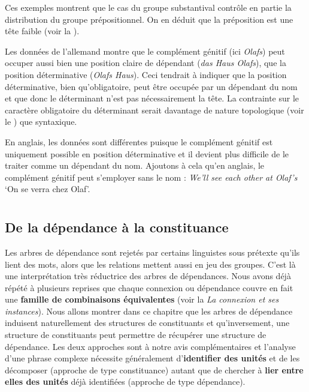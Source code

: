 {     Ces exemples montrent que le cas du groupe substantival contrôle en partie la distribution du groupe prépositionnel. On en déduit que la préposition est une tête faible (voir la ).

     Les données de l’allemand montre que le complément génitif (ici \textit{Olafs}) peut occuper aussi bien une position claire de dépendant (\textit{das Haus Olafs}), que la position déterminative (\textit{Olafs Haus}). Ceci tendrait à indiquer que la position déterminative, bien qu’obligatoire, peut être occupée par un dépendant du nom et que donc le déterminant n’est pas nécessairement la tête. La contrainte sur le caractère obligatoire du déterminant serait davantage de nature topologique (voir le ) que syntaxique.

    En anglais, les données sont différentes puisque le complément génitif est uniquement possible en position déterminative et il devient plus difficile de le traiter comme un dépendant du nom. Ajoutons à cela qu’en anglais, le complément génitif peut s’employer sans le nom : \textit{We’ll see each other at Olaf’s} ‘On se verra chez Olaf’.
}
\chapter{}\label{sec:3.4}

\section{De la dépendance à la constituance}\label{sec:3.4.0}

Les arbres de dépendance sont rejetés par certains linguistes sous prétexte qu’ils lient des mots, alors que les relations mettent aussi en jeu des groupes. C’est là une interprétation très réductrice des arbres de dépendances. Nous avons déjà répété à plusieurs reprises que chaque connexion ou dépendance couvre en fait une \textbf{famille de combinaisons équivalentes} (voir la  \textit{La connexion et ses instances}). Nous allons montrer dans ce chapitre que les arbres de dépendance induisent naturellement des structures de constituants et qu’inversement, une structure de constituants peut permettre de récupérer une structure de dépendance. Les deux approches sont à notre avis complémentaires et l’analyse d’une phrase complexe nécessite généralement d’\textbf{identifier des unités} et de les décomposer (approche de type constituance) autant que de chercher à \textbf{lier entre elles des unités} déjà identifiées (approche de type dépendance).

